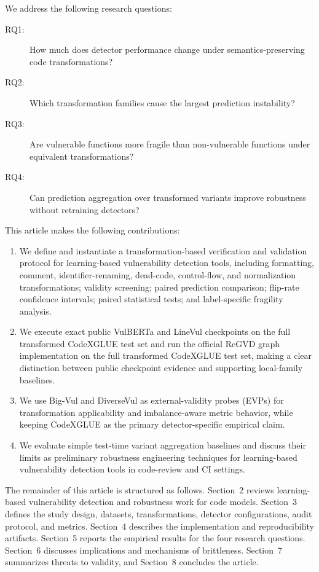 \documentclass[a4paper,fleqn]{cas-dc}
\begin{document}
We address the following research questions:

\begin{description}
  \item[RQ1:] How much does detector performance change under
  semantics-preserving code transformations?
  \item[RQ2:] Which transformation families cause the largest prediction
  instability?
  \item[RQ3:] Are vulnerable functions more fragile than non-vulnerable
  functions under equivalent transformations?
  \item[RQ4:] Can prediction aggregation over transformed variants improve
  robustness without retraining detectors?
\end{description}

This article makes the following contributions:

\begin{enumerate}
  \item We define and instantiate a transformation-based verification and
  validation protocol for learning-based vulnerability detection tools,
  including formatting, comment, identifier-renaming, dead-code, control-flow,
  and normalization transformations; validity screening; paired prediction
  comparison; flip-rate confidence intervals; paired statistical tests; and
  label-specific fragility analysis.
  \item We execute exact public VulBERTa and LineVul checkpoints on the full
  transformed CodeXGLUE test set and run the official ReGVD graph
  implementation on the full transformed CodeXGLUE test set, making a clear distinction between public
  checkpoint evidence and supporting local-family baselines.
  \item We use Big-Vul and DiverseVul as external-validity probes (EVPs) for
  transformation applicability and imbalance-aware metric behavior, while keeping CodeXGLUE as the primary
  detector-specific empirical claim.
  \item We evaluate simple test-time variant aggregation baselines and discuss
  their limits as preliminary robustness engineering techniques for
  learning-based vulnerability detection tools in code-review and CI settings.
\end{enumerate}

The remainder of this article is structured as follows. Section~2 reviews
learning-based vulnerability detection and robustness work for code models.
Section~3 defines the study design, datasets, transformations, detector
configurations, audit protocol, and metrics. Section~4 describes the
implementation and reproducibility artifacts. Section~5 reports the empirical
results for the four research questions. Section~6 discusses implications and
mechanisms of brittleness. Section~7 summarizes threats to validity, and
Section~8 concludes the article.
\end{document}
